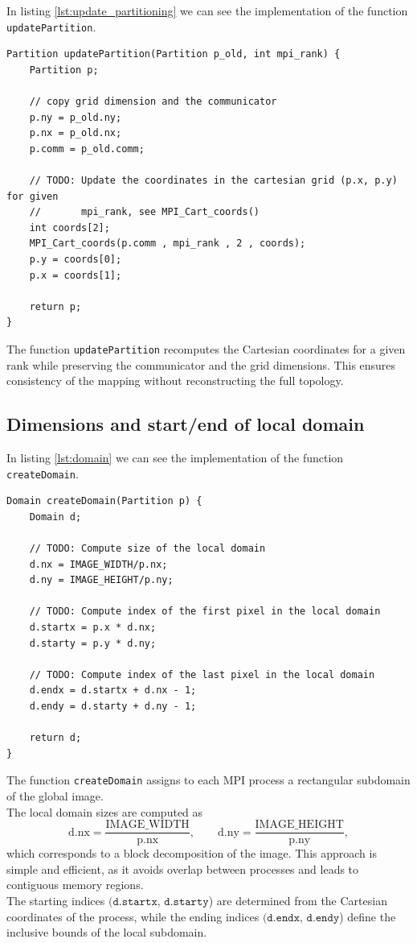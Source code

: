 \documentclass[unicode,10pt,a4paper,oneside,numbers=endperiod,openany]{scrartcl}
\begin{document}
In listing \ref{lst:update_partitioning} we can see the implementation of the function \texttt{updatePartition}.
\begin{lstlisting}[style=grayverbatim, caption={Updating the partitioning of the image}, label={lst:update_partitioning}]
Partition updatePartition(Partition p_old, int mpi_rank) {
    Partition p;

    // copy grid dimension and the communicator
    p.ny = p_old.ny;
    p.nx = p_old.nx;
    p.comm = p_old.comm;
    
    // TODO: Update the coordinates in the cartesian grid (p.x, p.y) for given
    //       mpi_rank, see MPI_Cart_coords()
    int coords[2];
    MPI_Cart_coords(p.comm , mpi_rank , 2 , coords);
    p.y = coords[0];
    p.x = coords[1];

    return p;
}
\end{lstlisting}

The function \texttt{updatePartition} recomputes the Cartesian coordinates for a given rank while preserving the communicator and the grid dimensions. This ensures consistency of the mapping without reconstructing the full topology.

\subsection{Dimensions and start/end of local domain}
In listing \ref{lst:domain} we can see the implementation of the function \texttt{createDomain}.
\begin{lstlisting}[style=grayverbatim, caption={Dimensions and start/end of local domain}, label={lst:domain}]
Domain createDomain(Partition p) {
    Domain d;

    // TODO: Compute size of the local domain
    d.nx = IMAGE_WIDTH/p.nx;
    d.ny = IMAGE_HEIGHT/p.ny;

    // TODO: Compute index of the first pixel in the local domain
    d.startx = p.x * d.nx;
    d.starty = p.y * d.ny;

    // TODO: Compute index of the last pixel in the local domain
    d.endx = d.startx + d.nx - 1;
    d.endy = d.starty + d.ny - 1;

    return d;
}
\end{lstlisting}

The function \texttt{createDomain} assigns to each MPI process a rectangular subdomain of the global image.\\
The local domain sizes are computed as
\[
\text{d.nx} = \frac{\text{IMAGE\_WIDTH}}{\text{p.nx}}, \qquad
\text{d.ny} = \frac{\text{IMAGE\_HEIGHT}}{\text{p.ny}},
\]
which corresponds to a block decomposition of the image. This approach is simple and efficient, as it avoids overlap between processes and leads to contiguous memory regions.\\
The starting indices \((\texttt{d.startx, d.starty}\)) are determined from the Cartesian coordinates of the process, while the ending indices \((\texttt{d.endx, d.endy}\)) define the inclusive bounds of the local subdomain.\\
\end{document}
